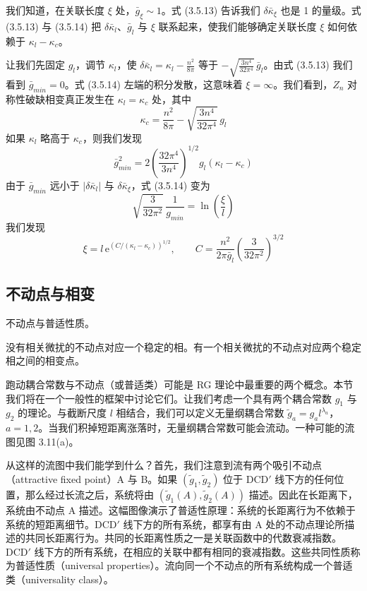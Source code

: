 我们知道，在关联长度 $\xi$ 处，$\bar{g}_\xi \sim 1$。式 (3.5.13) 告诉我们 $\delta\bar{\kappa}_\xi$ 也是 1 的量级。式 (3.5.13) 与 (3.5.14) 把 $\delta\bar{\kappa}_l$、$\bar{g}_l$ 与 $\xi$ 联系起来，使我们能够确定关联长度 $\xi$ 如何依赖于 $\kappa_l - \kappa_c$。

让我们先固定 $g_l$，调节 $\kappa_l$，使 $\delta\bar{\kappa}_l = \kappa_l - \frac{n^2}{8\pi}$ 等于 $-\sqrt{\frac{3n^4}{32\pi^4}}\,\bar{g}_l$。由式 (3.5.13) 我们看到 $\bar{g}_{min} = 0$。式 (3.5.14) 左端的积分发散，这意味着 $\xi = \infty$。我们看到，$Z_n$ 对称性破缺相变真正发生在 $\kappa_l = \kappa_c$ 处，其中
\begin{equation*}
\kappa_c = \frac{n^2}{8\pi} - \sqrt{\frac{3n^4}{32\pi^4}}\,g_l
\end{equation*}
如果 $\kappa_l$ 略高于 $\kappa_c$，则我们发现
\begin{equation*}
\bar{g}_{min}^2 = 2\left(\frac{32\pi^4}{3n^4}\right)^{1/2} g_l(\kappa_l - \kappa_c)
\end{equation*}
由于 $\bar{g}_{min}$ 远小于 $|\delta\bar{\kappa}_l|$ 与 $\delta\bar{\kappa}_\xi$，式 (3.5.14) 变为
\begin{equation*}
\sqrt{\frac{3}{32\pi^2}}\,\frac{1}{g_{min}} = \ln\!\left(\frac{\xi}{l}\right)
\end{equation*}
我们发现
\begin{equation*}
\xi = l\,\mathrm{e}^{\left(C/(\kappa_l - \kappa_c)\right)^{1/2}},\qquad C = \frac{n^2}{2\pi\bar{g}_l}\left(\frac{3}{32\pi^2}\right)^{3/2}
\end{equation*}

\subsection{不动点与相变}

\begin{keypoints}
\item 不动点与普适性质。
\item 没有相关微扰的不动点对应一个稳定的相。有一个相关微扰的不动点对应两个稳定相之间的相变点。
\end{keypoints}

跑动耦合常数与不动点（或普适类）可能是 RG 理论中最重要的两个概念。本节我们将在一个一般性的框架中讨论它们。让我们考虑一个具有两个耦合常数 $g_1$ 与 $g_2$ 的理论。与截断尺度 $l$ 相结合，我们可以定义无量纲耦合常数 $\tilde{g}_a = g_a l^{\lambda_a}$，$a = 1, 2$。当我们积掉短距离涨落时，无量纲耦合常数可能会流动。一种可能的流图见图 3.11(a)。

从这样的流图中我们能学到什么？首先，我们注意到流有两个吸引不动点（attractive fixed point）A 与 B。如果 $(\tilde{g}_1,\tilde{g}_2)$ 位于 DCD$'$ 线下方的任何位置，那么经过长流之后，系统将由 $(\tilde{g}_1(A),\tilde{g}_2(A))$ 描述。因此在长距离下，系统由不动点 A 描述。这幅图像演示了普适性原理：系统的长距离行为不依赖于系统的短距离细节。DCD$'$ 线下方的所有系统，都享有由 A 处的不动点理论所描述的共同长距离行为。共同的长距离性质之一是关联函数中的代数衰减指数。DCD$'$ 线下方的所有系统，在相应的关联中都有相同的衰减指数。这些共同性质称为普适性质（universal properties）。流向同一个不动点的所有系统构成一个普适类（universality class）。

